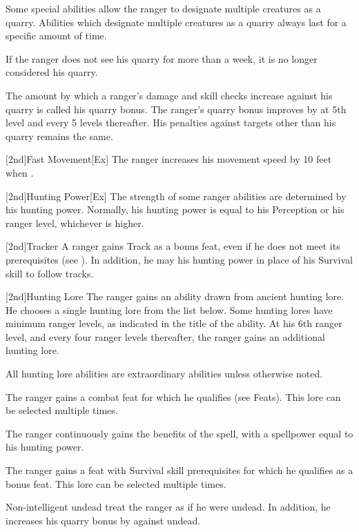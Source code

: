 Some special abilities allow the ranger to designate multiple creatures as a quarry.
Abilities which designate multiple creatures as a quarry always last for a specific amount of time.

If the ranger does not see his quarry for more than a week, it is no longer considered his quarry.

\par The amount by which a ranger's damage and skill checks increase against his quarry is called his quarry bonus.
The ranger's quarry bonus improves by  at 5th level and every 5 levels thereafter.
His penalties against targets other than his quarry remains the same.

[2nd]{Fast Movement}[Ex]
The ranger increases his movement speed by 10 feet when \unencumbered.

[2nd]{Hunting Power}[Ex]
The strength of some ranger abilities are determined by his hunting power.
Normally, his hunting power is equal to his Perception or his ranger level, whichever is higher.

[2nd]{Tracker}
A ranger gains Track as a bonus feat, even if he does not meet its prerequisites (see ).
In addition, he may his hunting power in place of his Survival skill to follow tracks.

[2nd]{Hunting Lore}
The ranger gains an ability drawn from ancient hunting lore.
He chooses a single hunting lore from the list below.
Some hunting lores have minimum ranger levels, as indicated in the title of the ability.
At his 6th ranger level, and every four ranger levels thereafter, the ranger gains an additional hunting lore.

All hunting lore abilities are extraordinary abilities unless otherwise noted.

The ranger gains a combat feat for which he qualifies (see Feats).
This lore can be selected multiple times.

The ranger continuously gains the benefits of the  spell, with a spellpower equal to his hunting power.

The ranger gains a feat with Survival skill prerequisites for which he qualifies as a bonus feat.
This lore can be selected multiple times.

Non-intelligent undead treat the ranger as if he were undead.
In addition, he increases his quarry bonus by  against undead.

